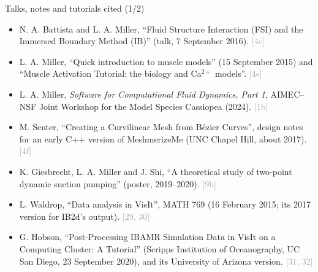 \documentclass[aspectratio=169,11pt]{beamer}
\newcommand{\ch}[1]{\textcolor{DarkGray}{[#1]}}
\begin{document}
\begin{frame}{Talks, notes and tutorials cited (1/2)}
\label{fr:talks}
\scriptsize
\begin{itemize}\setlength{\itemsep}{2pt}
  \item N. A. Battista and L. A. Miller, ``Fluid Structure Interaction (FSI) and the Immersed Boundary Method (IB)'' (talk, 7 September 2016). \ch{4e}
  \item L. A. Miller, ``Quick introduction to muscle models'' (15 September 2015) and ``Muscle Activation Tutorial: the biology and Ca$^{2+}$ models''. \ch{4e}
  \item L. A. Miller, \emph{Software for Computational Fluid Dynamics, Part 1}, AIMEC--NSF Joint Workshop for the Model Species Cassiopea (2024). \ch{1b}
  \item M. Senter, ``Creating a Curvilinear Mesh from B\'ezier Curves'', design notes for an early C++ version of MeshmerizeMe (UNC Chapel Hill, about 2017). \ch{4f}
  \item K. Giesbrecht, L. A. Miller and J. Shi, ``A theoretical study of two-point dynamic suction pumping'' (poster, 2019--2020). \ch{9b}
  \item L. Waldrop, ``Data analysis in VisIt'', MATH 769 (16 February 2015; its 2017 version for IB2d's output). \ch{29, 30}
  \item G. Hobson, ``Post-Processing IBAMR Simulation Data in VisIt on a Computing Cluster: A Tutorial'' (Scripps Institution of Oceanography, UC San Diego, 23 September 2020), and its University of Arizona version. \ch{31, 32}
\end{itemize}
\end{frame}
\end{document}
